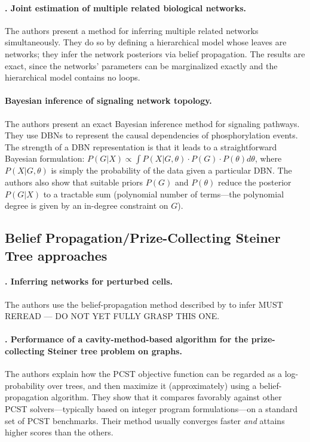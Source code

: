 \documentclass[14pt]{article}
\begin{document}
\paragraph{ \citet{2014-oates-joint}. Joint estimation of multiple related biological networks.}
The authors present a method for inferring multiple related networks simultaneously.
They do so by defining a hierarchical model whose leaves are networks;
they infer the network posteriors via belief propagation.
The results are exact, since the networks' parameters can be marginalized exactly and the hierarchical model contains no loops. 

\paragraph{ \citet{hill-bayesian-2012} Bayesian inference of signaling network topology.}
The authors present an exact Bayesian inference method for signaling pathways.
They use DBNs to represent the causal dependencies of phosphorylation events.
The strength of a DBN representation is that it leads to a straightforward Bayesian formulation:
$P(G|X) \propto \int P(X|G, \theta) \cdot P(G) \cdot P(\theta) d\theta$, where $P(X|G, \theta)$ is
simply the probability of the data given a particular DBN.
The authors also show that suitable priors $P(G)$ and $P(\theta)$ reduce the posterior $P(G|X)$
to a tractable sum (polynomial number of terms---the polynomial degree is given by an in-degree constraint on $G$).


\subsection{Belief Propagation/Prize-Collecting Steiner Tree approaches}

\paragraph{ \citet{2013-molinelli-perturbation}. Inferring networks for perturbed cells.}
The authors use the belief-propagation method described by \citeauthor{2012-biazzo-steiner} to infer 
MUST REREAD --- DO NOT YET FULLY GRASP THIS ONE.

\paragraph{ \citet{2012-biazzo-steiner}. Performance of a cavity-method-based algorithm for the prize-collecting Steiner tree problem on graphs.}
The authors explain how the PCST objective function can be regarded as a log-probability over trees, and then maximize it (approximately) using a belief-propagation algorithm.
They show that it compares favorably against other PCST solvers---typically based on integer program formulations---on a standard set of PCST benchmarks.
Their method usually converges faster \emph{and} attains higher scores than the others.
\end{document}
